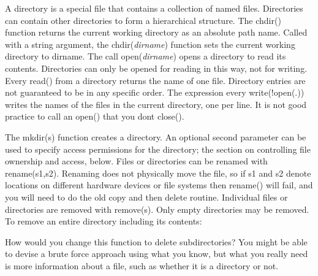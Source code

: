 A directory is a special file that contains a
collection of named files. Directories can contain other directories to
form a hierarchical structure. The \textsf{chdir()}
function returns the current working directory as an absolute path
name. Called with a string argument, the
\textsf{chdir(}\textsf{\textit{dirname}}\textsf{)} function sets the
current working directory to \textsf{dirname}. The call
\textsf{open(}\textsf{\textit{dirname}}\textsf{)} opens a directory to
read its contents. Directories can only be opened for reading in this
way, not for writing. Every \textsf{read()} from a directory returns
the name of one file. Directory entries are not guaranteed to be in any
specific order. The expression \textsf{every
write(!open({\textquotedbl}.{\textquotedbl}))} writes the names of the
files in the current directory, one per line. It is not good practice
to call an \textsf{open()} that you don{\textquotesingle}t
\textsf{close()}.

The \textsf{mkdir(s)} function creates a directory. An
optional second parameter can be used to specify access permissions for
the directory; the section on controlling file ownership and access,
below. Files or directories can be renamed with \textsf{rename(s1,s2)}.
Renaming does not physically move the file, so if \textsf{s1} and
\textsf{s2} denote locations on different hardware devices or file
systems then \textsf{rename()} will fail, and you will
need to do the old {\textquotedbl}copy and then delete{\textquotedbl}
routine. Individual files or directories are removed with
\textsf{remove(s)}. Only empty directories may be
removed. To remove an entire directory including its contents:


How would you change this function to delete subdirectories? You might
be able to devise a brute force approach using what you know, but what
you really need is more information about a file, such as whether it is
a directory or not.


